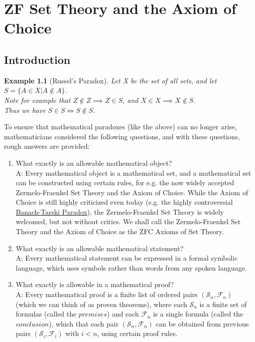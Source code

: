 \documentclass[11pt, oneside]{book}
\theoremstyle{break}
\newtheorem{eg}{Example}[section]
\begin{document}
\chapter{ZF Set Theory and the Axiom of Choice}\label{apdxA}
\section{Introduction}
\begin{eg}[Russel's Paradox]\label{russel_paradox}
	Let X be the set of all sets, and let $S = \{ A \in X | A \notin A\}$.\\
	Note for example that $Z \notin Z \implies Z \in S$, and $X \in X \implies X \notin S$.\\
	Thus we have $S \in S \iff S \notin S$.
\end{eg}

To ensure that mathematical paradoxes (like the above) can no longer arise, mathematicians considered the following questions, and with these questions, rough answers are provided:
\begin{enumerate}
	\item What exactly is an allowable mathematical object? \\
	A: Every mathematical object is a mathematical set, and a mathematical set can be constructed using certain rules, for e.g. the now widely accepted Zermelo-Fraenkel Set Theory and the Axiom of Choice. While the Axiom of Choice is still highly criticized even today (e.g. the highly controversial \href{https://en.wikipedia.org/wiki/Banach–Tarski_paradox}{Banach-Tarski Paradox}), the Zermelo-Fraenkel Set Theory is widely welcomed, but not without critics. We shall call the Zermelo-Fraenkel Set Theory and the Axiom of Choice as the ZFC Axioms of Set Theory.
	\item What exactly is an allowable mathematical statement? \\
	A: Every mathematical statement can be expressed in a formal symbolic language, which uses symbols rather than words from any spoken language.
	\item What exactly is allowable in a mathematical proof? \\
	A: Every mathematical proof is a finite list of ordered pairs $(\mathscr{S}_n, \mathscr{F}_n)$ (which we can think of as proven theorems), where each $\mathscr{S}_n$ is a finite set of formulas (called the $\textit{premises}$) and each $\mathscr{F}_n$ is a single formula (called the $\textit{conclusion}$), which that each pair $(\mathscr{S}_n, \mathscr{F}_n)$ can be obtained from previous pairs $(\mathscr{S}_i, \mathscr{F}_i)$ with $i < n$, using certain proof rules.
\end{enumerate}
\end{document}
